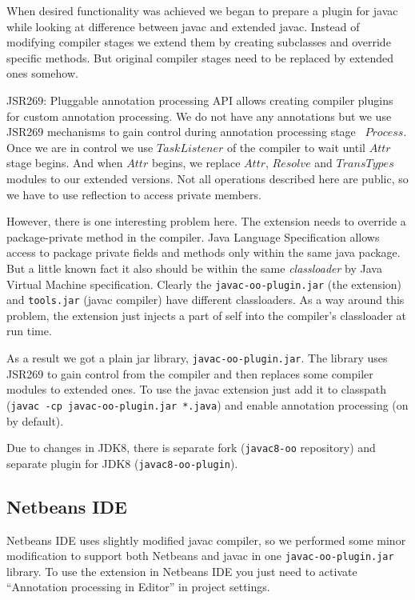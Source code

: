 \documentclass{aircc}
\begin{document}
When desired functionality was achieved we began to prepare a plugin for javac while looking at difference between javac and extended javac.
Instead of modifying compiler stages we extend them by creating subclasses and override specific methods.
But original compiler stages need to be replaced by extended ones somehow.

JSR269: Pluggable annotation processing API\cite{jsr269} allows creating compiler plugins for custom annotation processing.
We do not have any annotations but we use JSR269 mechanisms to gain control during annotation processing stage \textemdash~$Process$.
Once we are in control we use $TaskListener$ of the compiler to wait until $Attr$ stage begins.
And when $Attr$ begins, we replace $Attr$, $Resolve$ and $TransTypes$ modules to our extended versions.
Not all operations described here are public, so we have to use reflection to access private members.

However, there is one interesting problem\cite{soPackagePrivate} here.
The extension needs to override a package-private method in the compiler.
Java Language Specification\cite{jls} allows access to package private fields and methods only within the same java package.
But a little known fact it also should be within the same \textit{classloader} by Java Virtual Machine specification\cite{jvmspecPP}. 
Clearly the \texttt{javac-oo-plugin.jar} (the extension) and \texttt{tools.jar} (javac compiler) have different classloaders.
As a way around this problem, the extension just injects a part of self into the compiler's classloader at run time\cite{soPackagePrivate}.

As a result we got a plain jar library, \texttt{javac-oo-plugin.jar}.
The library uses JSR269 to gain control from the compiler and then replaces some compiler modules to extended ones.
To use the javac extension just add it to classpath (\texttt{javac -cp javac-oo-plugin.jar *.java}) and enable annotation processing (on by default).

Due to changes in JDK8, there is separate fork (\texttt{javac8-oo} repository) and separate plugin for JDK8 (\texttt{javac8-oo-plugin}).


\subsection{Netbeans IDE}

Netbeans IDE uses slightly modified javac compiler, 
so we performed some minor modification to support both Netbeans and javac in one \texttt{javac-oo-plugin.jar} library.
To use the extension in Netbeans IDE you just need to activate ``Annotation processing in Editor'' in project settings.
\end{document}
